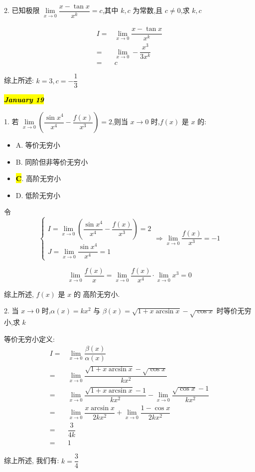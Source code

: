 2. 已知极限 $\lim\limits_{x\to 0}\dfrac{x-\tan x}{x^{k}}=c$,其中 $k,c$ 为常数,且 $c\neq 0$,求 $k,c$
\begin{solution}

	\begin{align*}
		I = & \lim\limits_{x\to 0}\dfrac{x-\tan x}{x^{k}}\\
		  = & \lim\limits_{x\to 0}-\dfrac{x^{3}}{3x^{k}}\\
		  = & c
	\end{align*}

	综上所述: $k = 3, c = -\dfrac{1}{3}$
\end{solution}

\hl{\textbf{\textit{January 19}}}

1. 若 $\lim\limits_{x\to 0}\left(\dfrac{\sin x^{4}}{x^{4}}-\dfrac{f(x)}{x^{3}}\right)=2$,则当 $x\to 0$ 时,$f(x)$ 是 $x$ 的:
\begin{itemize}
	\item A. 等价无穷小
	\item B. 同阶但非等价无穷小
	\item \hl{\textbf{C}}. 高阶无穷小
	\item D. 低阶无穷小
\end{itemize}
\begin{solution}

	令 
	$$\begin{cases}
		I = \lim\limits_{x\to 0}\left(\dfrac{\sin x^{4}}{x^{4}}-\dfrac{f(x)}{x^{3}}\right) = 2\\
		J = \lim\limits_{x\to 0}\dfrac{\sin x^{4}}{x^{4}} = 1
	\end{cases}\Rightarrow \lim\limits_{x\to 0}\dfrac{f(x)}{x^{3}} = -1$$

	$$\lim\limits_{x\to 0}\dfrac{f(x)}{x} = \lim\limits_{x\to 0}\dfrac{f(x)}{x^{4}}\cdot\lim\limits_{x\to 0}x^{3} = 0$$

	综上所述, $f(x)$ 是 $x$ 的 高阶无穷小.
\end{solution}

2. 当 $x\to 0$ 时,$\alpha(x)=kx^{2}$ 与 $\beta(x)=\sqrt{1+x\arcsin x}-\sqrt{\cos x}$ 时等价无穷小,求 $k$
\begin{solution}

	等价无穷小定义:
	\begin{align*}
		I = & \lim\limits_{x\to 0}\dfrac{\beta(x)}{\alpha(x)}\\
		  = & \lim\limits_{x\to 0}\dfrac{\sqrt{1+x\arcsin x}-\sqrt{\cos x}}{kx^{2}}\\
		  = & \lim\limits_{x\to 0}\dfrac{\sqrt{1+x\arcsin x}-1}{kx^{2}}-\lim\limits_{x\to 0}\dfrac{\sqrt{\cos x}-1}{kx^{2}}\\
		  = & \lim\limits_{x\to 0}\dfrac{x\arcsin x}{2kx^{2}}+\lim\limits_{x\to 0}\dfrac{1-\cos x}{2kx^{2}}\\
		  = & \dfrac{3}{4k}\\
		  = & 1
	\end{align*}

	综上所述, 我们有: $k = \dfrac{3}{4}$
\end{solution}

